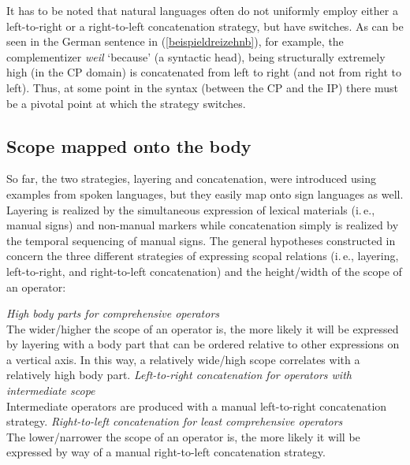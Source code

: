 \noindent It has to be noted that natural languages often do not uniformly employ either a left-to-right or a right-to-left concatenation strategy, but have switches. As can be seen in the German sentence in (\ref{beispieldreizehnb}), for example, the complementizer \textit{weil} `because' (a syntactic head), being structurally extremely high (in the CP domain) is concatenated from left to right (and not from right to left). Thus, at some point in the syntax (between the CP and the IP) there must be a pivotal point at which the strategy switches. 

\subsection{Scope mapped onto the body}
So far, the two strategies, layering and concatenation, were introduced using examples from spoken languages, but they easily map onto sign languages as well. Layering is realized by the simultaneous expression of lexical materials (i.\,e., manual signs) and non-manual markers while concatenation simply is realized by the temporal sequencing of manual signs. The general hypotheses constructed in \citet[14]{bross2017scope} concern the three different strategies of expressing scopal relations (i.\,e., layering, left-to-right, and right-to-left concatenation) and the height/width of the scope of an operator:



\begin{exe} 
\ex \label{hypohypo} 
\begin{xlist} 
\ex \textit{High body parts for comprehensive operators} \\
The wider/higher the scope of an operator is, the more likely it will be expressed by layering with a body part that can be ordered relative to other expressions on a vertical axis. In this way, a relatively wide/high scope correlates with a relatively high body part.   \label{hypothesisa}
\ex \textit{Left-to-right concatenation for operators with intermediate scope}\\
Intermediate operators are produced with a manual left-to-right concatenation strategy.  \label{hypothesisb} 
\ex  \textit{Right-to-left concatenation for least comprehensive operators} \\
The lower/narrower the scope of an operator is, the more likely it will be expressed by way of a manual right-to-left concatenation strategy. \label{hypothesisc}
\end{xlist} 
\end{exe}


